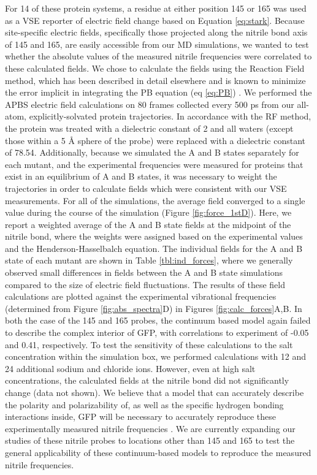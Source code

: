 For 14 of these protein systems, a \pCNF{} residue at either position 145 or 165 was used as a VSE reporter of electric field change based on Equation \ref{eq:stark}.
Because site-specific electric fields, specifically those projected along the nitrile bond axis of \pCNF{} 145 and 165, are easily accessible from our MD simulations, we wanted to test whether the absolute values of the measured nitrile frequencies were correlated to these calculated fields.
We chose to calculate the fields using the Reaction Field method, which has been described in detail elsewhere and is known to minimize the error implicit in integrating the PB equation (eq \ref{eq:PB}) \cite{Ritchie2015}.
We performed the APBS electric field calculations on 80 frames collected every 500 ps from our all-atom, explicitly-solvated protein trajectories.
In accordance with the RF method, the protein was treated with a dielectric constant of 2 and all waters (except those within a 5 \si{\angstrom} sphere of the \pCNF{} probe) were replaced with a dielectric constant of 78.54.
Additionally, because we simulated the A and B states separately for each mutant, and the experimental frequencies were measured for proteins that exist in an equilibrium of A and B states, it was necessary to weight the trajectories in order to calculate fields which were consistent with our VSE measurements.
For all of the simulations, the average field converged to a single value during the course of the simulation (Figure \ref{fig:force_1stD}).
Here, we report a weighted average of the A and B state fields at the midpoint of the nitrile bond, where the weights were assigned based on the experimental \pKa{} values and the Henderson-Hasselbalch equation.
The individual fields for the A and B state of each mutant are shown in Table \ref{tbl:ind_forces}, where we generally observed small differences in fields between the A and B state simulations compared to the size of electric field fluctuations.
The results of these field calculations are plotted against the experimental vibrational frequencies (determined from Figure \ref{fig:abs_spectra}D) in Figures \ref{fig:calc_forces}A,B.
In both the case of the \pCNF{} 145 and 165 probes, the continuum based model again failed to describe the complex interior of GFP, with correlations to experiment of -0.05 and 0.41, respectively.
To test the sensitivity of these calculations to the salt concentration within the simulation box, we performed calculations with 12 and 24 additional sodium and chloride ions.
However, even at high salt concentrations, the calculated fields at the nitrile bond did not significantly change (data not shown).
We believe that a model that can accurately describe the polarity and polarizability of, as well as the specific hydrogen bonding interactions inside, GFP will be necessary to accurately reproduce these experimentally measured nitrile frequencies \cite{Blasiak2016}.
We are currently expanding our studies of these nitrile probes to locations other than 145 and 165 to test the general applicability of these continuum-based models to reproduce the measured nitrile frequencies.

